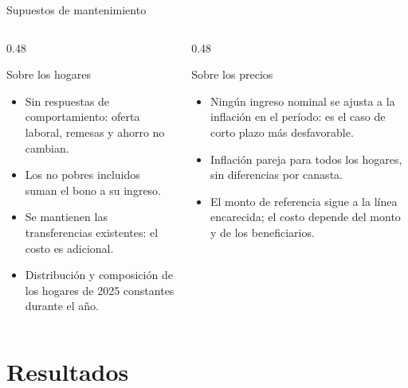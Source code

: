 \documentclass[aspectratio=169,11pt]{beamer}
\begin{document}
\begin{frame}{Supuestos de mantenimiento}
  \begin{columns}[T]
    \begin{column}{0.48\textwidth}
      \begin{block}{Sobre los hogares}\small
        \begin{itemize}
          \item Sin respuestas de comportamiento: oferta laboral, remesas y ahorro no cambian.
          \item Los no pobres incluidos suman el bono a su ingreso.
          \item Se mantienen las transferencias existentes: el costo es adicional.
          \item Distribución y composición de los hogares de 2025 constantes durante el año.
        \end{itemize}
      \end{block}
    \end{column}
    \begin{column}{0.48\textwidth}
      \begin{block}{Sobre los precios}\small
        \begin{itemize}
          \item Ningún ingreso nominal se ajusta a la inflación en el período: es el caso de corto plazo más desfavorable.
          \item Inflación pareja para todos los hogares, sin diferencias por canasta.
          \item El monto de referencia sigue a la línea encarecida; el costo depende del monto y de los beneficiarios.
        \end{itemize}
      \end{block}
    \end{column}
  \end{columns}
\end{frame}

\section{Resultados}
\end{document}
